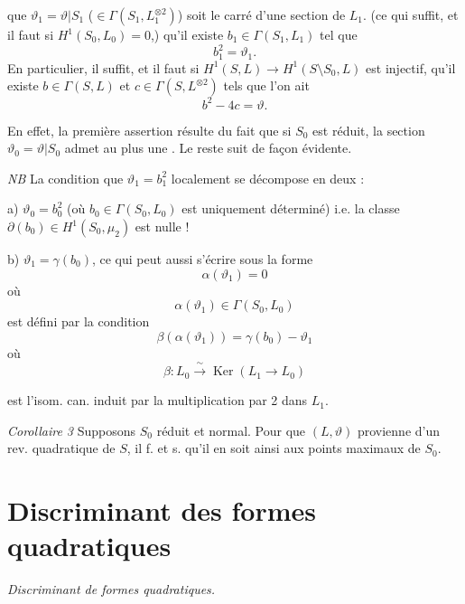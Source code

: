 \documentclass[11pt,a4paper]{article}
\begin{document}
\struck{\ill{}} que $\vartheta_1 = \vartheta|S_1$ ($\in \Gamma(S_1, L_1^{\otimes 2})$) soit le carré d'une section de $L_1$. (ce qui suffit, et il faut si $H^1(S_0, L_0) = 0$,)    qu'il existe $b_1 \in \Gamma(S_1, L_1)$ tel que
\[
  b_1^2 = \vartheta_1 .
\]
En particulier, il suffit, et il faut si $H^1(S, L) \to H^1(S \setminus S_0, L)$ est injectif, qu'il existe $b \in \Gamma(S, L)$ et $c \in \Gamma(S, L^{\otimes 2})$ tels que l'on ait
\[
  b^2 - 4c = \vartheta .
\]

En effet, la première assertion résulte du fait que si $S_0$ est réduit, la section $\vartheta_0 = \vartheta|S_0$ admet au plus une \emph{}. Le reste suit de façon évidente.

\emph{NB} La condition que $\vartheta_1 = b_1^2$ localement se décompose en deux :

a) $\vartheta_0 = b_0^2$ (où $b_0 \in \Gamma(S_0, L_0)$ est uniquement déterminé) i.e. \struck{\ill{}} la classe $\partial(b_0) \in H^1(S_0, \mu_2)$ est nulle !

b) $\vartheta_1 = \gamma(b_0)$, ce qui peut aussi s'écrire sous la forme
\[
  \alpha(\vartheta_1) = 0
\]
où
\[
  \alpha(\vartheta_1) \in \Gamma(S_0, L_0)
\]
est défini par la condition
\[
  \beta(\alpha(\vartheta_1)) = \gamma(b_0) - \vartheta_1
\]
où
\[
  \beta : L_0 \xrightarrow{\ \sim\ } \operatorname{Ker}(L_1 \to L_0)
\]

est l'isom. can. induit par la multiplication par 2 dans $L_1$.

\emph{Corollaire 3} Supposons $S_0$ réduit et normal. Pour que $(L, \vartheta)$ provienne d'un rev. quadratique de $S$, il f. et s. qu'il en soit ainsi aux points  maximaux de $S_0$.

\section{Discriminant des formes quadratiques}

\emph{Discriminant de formes quadratiques.}
\end{document}
